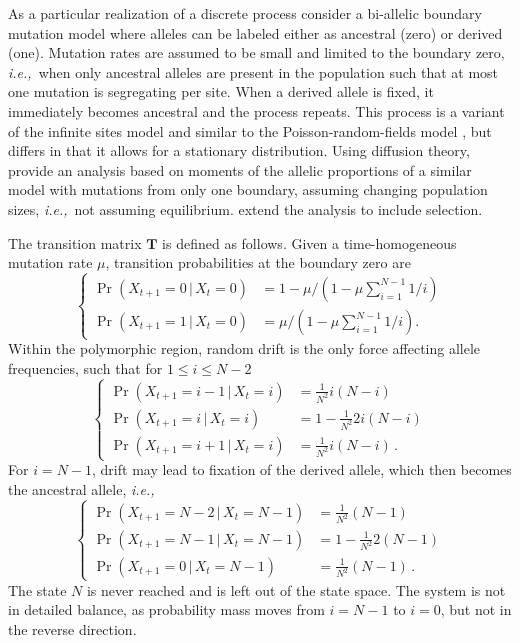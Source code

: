 \documentclass[preprint]{elsarticle}
\newcommand\given{{\,|\,}}
\newcommand\ie{{\it i.e.,}}
\newcommand\x[1]{\ensuremath{X_{#1}}}
\begin{document}
As a particular realization of a discrete process consider a bi-allelic boundary mutation model where alleles can be labeled either as ancestral (zero) or derived (one). Mutation rates are assumed to be small and limited to the boundary zero, \ie\ when only ancestral alleles are present in the population such that at most one mutation is segregating per site. When a derived allele is fixed, it immediately becomes ancestral and the process repeats. This process is a variant of the infinite sites model \citep{Kimu69} and similar to the Poisson-random-fields model \citep{Sawy92}, but differs in that it allows for a stationary distribution. Using diffusion theory, \citet{Evan07} provide an analysis based on moments of the allelic proportions of a similar model with mutations from only one boundary, assuming changing population sizes, \ie\ not assuming equilibrium. \citet{Zivk15} extend the analysis to include selection. 

The transition matrix $\mathbf{T}$ is defined as follows. Given a time-homogeneous mutation rate $\mu$, transition probabilities at the boundary zero are
\begin{equation}
\begin{cases}
\Pr(\x{t+1}=0\given \x{t}=0)&=1-\mu/(1-\mu\sum_{i=1}^{N-1}1/i)\\
\Pr(\x{t+1}=1\given \x{t}=0)&=\mu/(1-\mu\sum_{i=1}^{N-1}1/i).
\end{cases}
\end{equation}
Within the polymorphic region, random drift is the only force affecting allele frequencies, such that for $1\leq i \leq N-2$
\begin{equation}
\begin{cases}
\Pr(\x{t+1}=i-1\given \x{t}=i) &=\frac1{N^2} i(N-i)\\
\Pr(\x{t+1}=i\given \x{t}=i)   &=1-\frac1{N^2} 2i(N-i)\\
\Pr(\x{t+1}=i+1\given \x{t}=i) &=\frac1{N^2} i(N-i)\,.
\end{cases}
\end{equation}
For $i=N-1$, drift may lead to fixation of the derived allele, which then becomes the ancestral allele, \ie\
\begin{equation}
\begin{cases}
\Pr(\x{t+1}=N-2\given \x{t}=N-1) &=\frac1{N^2} (N-1)\\
\Pr(\x{t+1}=N-1\given \x{t}=N-1) &=1-\frac1{N^2} 2(N-1)\\
\Pr(\x{t+1}=0\given \x{t}=N-1)   &=\frac1{N^2} (N-1)\,.
\end{cases}
\end{equation}
The state $N$ is never reached and is left out of the state space. The system is not in detailed balance, as probability mass moves from $i=N-1$ to $i=0$, but not in the reverse direction.
\end{document}
